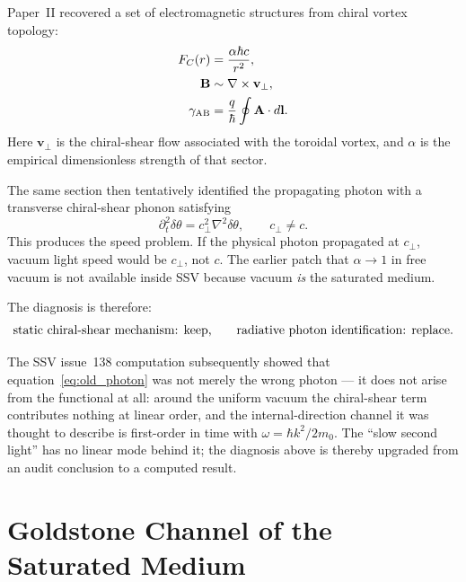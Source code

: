 \documentclass[11pt,a4paper]{article}
\begin{document}
Paper~II recovered a set of electromagnetic structures from chiral vortex
topology:
\begin{align}
    F_C(r) &= \frac{\alpha\hbar c}{r^2}, \label{eq:coulomb}\\
    \mathbf{B} &\sim \nabla\times\mathbf{v}_\perp, \label{eq:Bcurl}\\
    \gamma_{\rm AB} &= \frac{q}{\hbar}\oint\mathbf{A}\cdot d\mathbf{l}.
    \label{eq:AB}
\end{align}
Here $\mathbf{v}_\perp$ is the chiral-shear flow associated with the
toroidal vortex, and $\alpha$ is the empirical dimensionless strength of
that sector.

The same section then tentatively identified the propagating photon with a
transverse chiral-shear phonon satisfying
\begin{equation}
    \partial_t^2\delta\theta
    =
    c_\perp^2\nabla^2\delta\theta,
    \qquad
    c_\perp \neq c.
    \label{eq:old_photon}
\end{equation}
This produces the speed problem.  If the physical photon propagated at
$c_\perp$, vacuum light speed would be $c_\perp$, not $c$.  The earlier
patch that $\alpha\to1$ in free vacuum is not available inside SSV because
vacuum \emph{is} the saturated medium.

The diagnosis is therefore:
\begin{equation}
    \hbox{static chiral-shear mechanism: keep,}
    \qquad
    \hbox{radiative photon identification: replace.}
    \label{eq:diagnosis}
\end{equation}

The SSV issue~138 computation subsequently showed that
equation~\eqref{eq:old_photon} was not merely the wrong photon --- it does
not arise from the functional at all: around the uniform vacuum the
chiral-shear term contributes nothing at linear order, and the
internal-direction channel it was thought to describe is first-order in
time with $\omega=\hbar k^2/2m_0$.  The ``slow second light'' has no
linear mode behind it; the diagnosis above is thereby upgraded from an
audit conclusion to a computed result.

\section{Goldstone Channel of the Saturated Medium}
\label{sec:goldstone}
\end{document}
